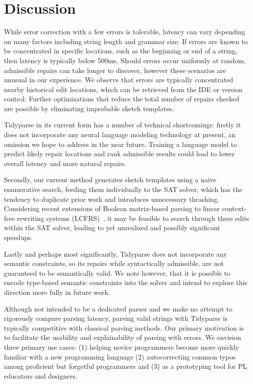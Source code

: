 \documentclass[sigplan,review,anonymous,acmsmall]{acmart}\settopmatter{printfolios=false,printccs=false,printacmref=false}
\begin{document}
    \section{Discussion}

    While error correction with a few errors is tolerable, latency can vary depending on many factors including string length and grammar size. If errors are known to be concentrated in specific locations, such as the beginning or end of a string, then latency is typically below 500ms. Should errors occur uniformly at random, admissible repairs can take longer to discover, however these scenarios are unusual in our experience. We observe that errors are typically concentrated nearby historical edit locations, which can be retrieved from the IDE or version control. Further optimizations that reduce the total number of repairs checked are possible by eliminating improbable sketch templates.

    Tidyparse in its current form has a number of technical shortcomings: firstly it does not incorporate any neural language modeling technology at present, an omission we hope to address in the near future. Training a language model to predict likely repair locations and rank admissible results could lead to lower overall latency and more natural repairs.

    Secondly, our current method generates sketch templates using a na\"ive enumerative search, feeding them individually to the SAT solver, which has the tendency to duplicate prior work and introduces unnecessary thrashing. Considering recent extensions of Boolean matrix-based parsing to linear context-free rewriting systems (LCFRS)~\cite{cohen2016parsing}, it may be feasible to search through these edits within the SAT solver, leading to yet unrealized and possibly significant speedups.

    Lastly and perhaps most significantly, Tidyparse does not incorporate any semantic constraints, so its repairs while syntactically admissible, are not guaranteed to be semantically valid. We note however, that it is possible to encode type-based semantic constraints into the solver and intend to explore this direction more fully in future work.

    Although not intended to be a dedicated parser and we make no attempt to rigorously compare parsing latency, parsing valid strings with Tidyparse is typically competitive with classical parsing methods. Our primary motivation is to facilitate the usability and explainability of parsing with errors. We envision three primary use cases: (1) helping novice programmers become more quickly familiar with a new programming language (2) autocorrecting common typos among proficient but forgetful programmers and (3) as a prototyping tool for PL educators and designers.
\end{document}
